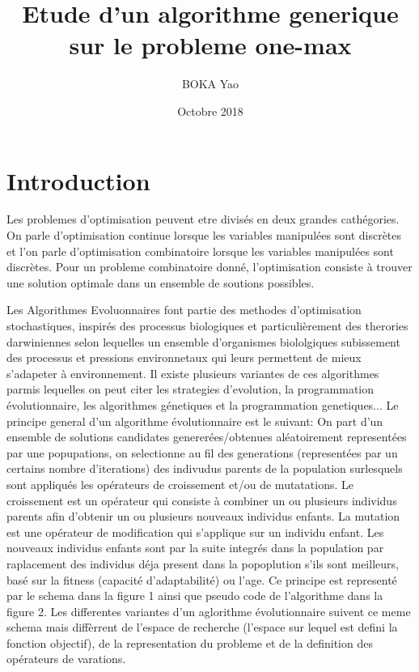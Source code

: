 \documentclass{article}
\title{Etude d'un algorithme generique sur le probleme one-max}
\author{BOKA Yao }
\date{Octobre 2018}
\begin{document}
\maketitle

\section{Introduction}

Les problemes d'optimisation peuvent etre divisés en deux grandes cathégories. On parle d'optimisation continue lorsque les variables manipulées sont discrètes et l'on parle d'optimisation combinatoire lorsque les variables manipulées sont discrètes.
Pour un probleme combinatoire donné, l'optimisation consiste à trouver une solution optimale dans un  ensemble de soutions possibles.

Les Algorithmes Evoluonnaires font partie des methodes d'optimisation stochastiques, inspirés des processus biologiques et particulièrement des therories darwiniennes  selon lequelles un ensemble d'organismes biololgiques subissement des processus et pressions environnetaux qui leurs permettent de mieux s'adapeter à environnement. Il existe plusieurs variantes de ces algorithmes parmis lequelles on peut citer les strategies d'evolution, la programmation évolutionnaire, les algorithmes génetiques et la programmation genetiques...
Le principe general d'un algorithme évolutionnaire est le suivant: On part d'un ensemble de solutions candidates genererées/obtenues aléatoirement representées par une popupations, on selectionne au fil des generations (representées par un certains nombre d'iterations) des indivudus parents de la population surlesquels sont appliqués les opérateurs de croissement et/ou de mutatations. Le croissement est un opérateur qui consiste à combiner un ou plusieurs individus parents afin d'obtenir un ou plusieurs nouveaux individus enfants. La mutation est une opérateur de modification qui s'applique sur un individu enfant. Les nouveaux individus enfants sont par la suite integrés dans la population par raplacement des individus déja present dans la popoplution s'ils sont meilleurs, basé sur la fitness (capacité d'adaptabilité) ou l'age.  Ce principe est representé par le schema dans la figure 1 ainsi que pseudo code de l'algorithme dans la figure 2.
Les differentes variantes d'un aglorithme évolutionnaire suivent ce meme schema mais diffèrrent de l'espace de recherche (l'espace sur lequel est defini la fonction objectif), de la representation du probleme et de la definition des opérateurs de varations.
\end{document}
